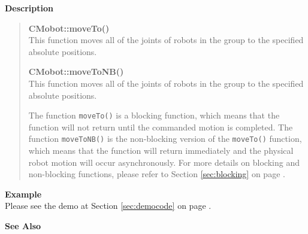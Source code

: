 \noindent
{\bf Description}\\
\vspace{-12pt}
\begin{quote}
{\bf CMobot::moveTo()}\\
This function moves all of the joints of robots in the group to the specified absolute positions. 

{\bf CMobot::moveToNB()}\\
This function moves all of the joints of robots in the group to the specified absolute positions. 

The function \texttt{moveTo()} is a blocking function, which means that 
the function will not return until the commanded motion is 
completed. The function \texttt{moveToNB()} is the non-blocking version of
the \texttt{moveTo()} function, which means that the function will return
immediately and the physical robot motion will occur asynchronously. For
more details on blocking and non-blocking functions, please refer to 
Section \ref{sec:blocking} on page \pageref{sec:blocking}.\\
\end{quote}

\noindent
{\bf Example}\\
Please see the demo at Section \ref{sec:democode} on page \pageref{sec:democode}.\\
\noindent

\noindent
{\bf See Also}\\

